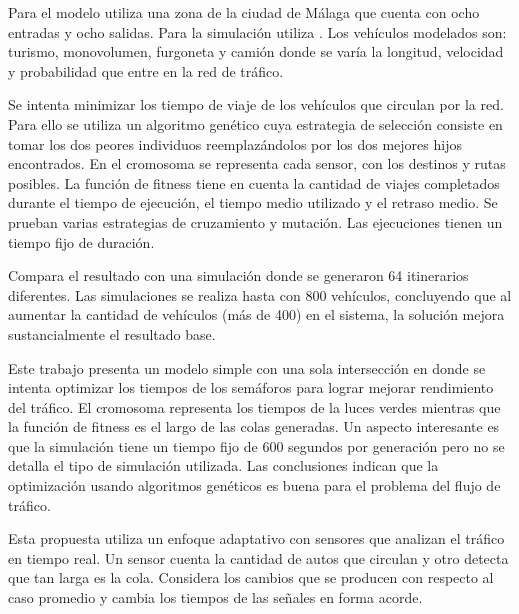 \begin{itemize}
\begin{item}
Para el modelo utiliza una zona  de la ciudad de Málaga que cuenta con ocho entradas y ocho salidas. Para la simulación utiliza \citet{SUMO}. Los vehículos modelados son: turismo, monovolumen, furgoneta y camión donde se varía la longitud, velocidad y probabilidad que entre en la red de tráfico.

Se intenta minimizar los tiempo de viaje de los vehículos que circulan por la red. Para ello se utiliza un algoritmo genético cuya estrategia de selección consiste en tomar los dos peores individuos reemplazándolos por los dos mejores hijos encontrados. En el cromosoma se representa cada sensor, con los destinos y rutas posibles. La función de fitness tiene en cuenta la cantidad de viajes completados durante el tiempo de ejecución, el tiempo medio utilizado y el retraso medio. Se prueban varias estrategias de cruzamiento y mutación. Las ejecuciones tienen un tiempo fijo de duración.

Compara el resultado con una simulación donde se generaron 64 itinerarios diferentes. Las simulaciones se realiza hasta con 800 vehículos, concluyendo que al aumentar la cantidad de vehículos (más de 400) en el sistema, la solución mejora sustancialmente el resultado base.

\end{item}	


\begin{item}

Este trabajo presenta un modelo simple con una sola intersección en donde se intenta optimizar los tiempos de los semáforos para lograr mejorar rendimiento del tráfico. El cromosoma representa los tiempos de la luces verdes mientras que la función de fitness es el largo de las colas generadas. Un aspecto interesante es que la simulación tiene un tiempo fijo de 600 segundos por generación pero no se detalla el tipo de simulación utilizada. Las conclusiones indican que la optimización usando algoritmos genéticos  es buena para el problema del flujo de tráfico.	
\end{item}	


\begin{item}

Esta propuesta utiliza un enfoque adaptativo con sensores que analizan el tráfico en tiempo real. Un sensor cuenta la cantidad de autos que circulan y otro detecta que tan larga es la cola. Considera los cambios que se producen con respecto al caso promedio y cambia los tiempos de las señales en forma acorde.


\end{item}
\end{itemize}
